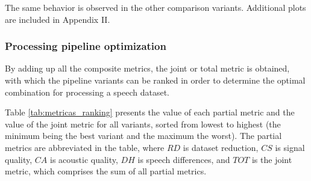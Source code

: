 The same behavior is observed in the other comparison variants. Additional plots are included in Appendix II.

\subsubsection{Processing pipeline optimization}
By adding up all the composite metrics, the joint or total metric is obtained, with which the pipeline variants can be ranked in order to determine the optimal combination for processing a speech dataset.

Table \ref{tab:metricas_ranking} presents the value of each partial metric and the value of the joint metric for all variants, sorted from lowest to highest (the minimum being the best variant and the maximum the worst). The partial metrics are abbreviated in the table, where $RD$ is dataset reduction, $CS$ is signal quality, $CA$ is acoustic quality, $DH$ is speech differences, and $TOT$ is the joint metric, which comprises the sum of all partial metrics.

